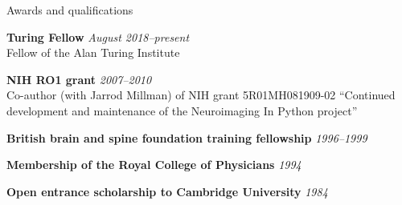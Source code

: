 \documentclass{cv}
\newcommand{\PlaceDateNote}[3]{{\bf #1} \hfill {\em #2} \\#3}
\begin{document}
\begin{cvSection}{Awards and qualifications}

\PlaceDateNote{Turing Fellow}{August 2018--present}
    {Fellow of the Alan Turing Institute}

\PlaceDateNote{NIH RO1 grant}{2007--2010}
{Co-author (with Jarrod Millman) of NIH grant 5R01MH081909-02 ``Continued
development and maintenance of the Neuroimaging In Python project''}

{\bf British brain and spine foundation training fellowship} \hfill {\em
1996--1999}

{\bf Membership of the Royal College of Physicians} \hfill {\em 1994}

{\bf Open entrance scholarship to Cambridge University} \hfill {\em 1984}

\end{cvSection}
\end{document}
